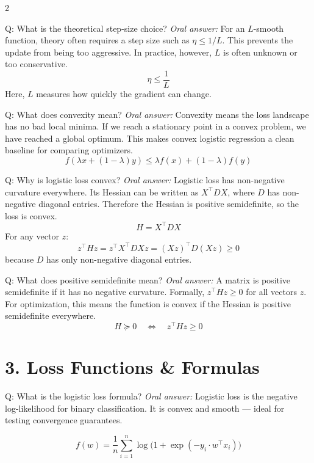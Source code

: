 \documentclass[a4paper,9pt]{article}
\newcommand{\oral}{\textit{\color{darkgray}Oral answer: }}
\begin{document}
\begin{multicols}{2}
\begin{qa}{Q: What is the theoretical step-size choice?}
\oral For an \(L\)-smooth function, theory often requires a step size such as \(\eta\leq 1/L\). 
This prevents the update from being too aggressive. 
In practice, however, \(L\) is often unknown or too conservative.
\[
\eta \leq \frac{1}{L}
\]
Here, \(L\) measures how quickly the gradient can change.
\end{qa}

\begin{qa}{Q: What does convexity mean?}
\oral Convexity means the loss landscape has no bad local minima. 
If we reach a stationary point in a convex problem, we have reached a global optimum. 
This makes convex logistic regression a clean baseline for comparing optimizers.
\[
f(\lambda x+(1-\lambda)y)
\leq
\lambda f(x)+(1-\lambda)f(y)
\]
\end{qa}

\begin{qa}{Q: Why is logistic loss convex?}
\oral Logistic loss has non-negative curvature everywhere. 
Its Hessian can be written as \(X^\top D X\), where \(D\) has non-negative diagonal entries. 
Therefore the Hessian is positive semidefinite, so the loss is convex.
\[
H=X^\top D X
\]
For any vector \(z\):
\[
z^\top H z = z^\top X^\top D Xz = (Xz)^\top D(Xz) \geq 0
\]
because \(D\) has only non-negative diagonal entries.
\end{qa}

\begin{qa}{Q: What does positive semidefinite mean?}
\oral A matrix is positive semidefinite if it has no negative curvature. 
Formally, \(z^\top H z\geq 0\) for all vectors \(z\). 
For optimization, this means the function is convex if the Hessian is positive semidefinite everywhere.
\[
H\succeq 0
\quad \Longleftrightarrow \quad
z^\top H z\geq 0
\]
\end{qa}

\section{3. Loss Functions \& Formulas}

\begin{qa}{Q: What is the logistic loss formula?}
\oral Logistic loss is the negative log-likelihood for binary classification.
It is convex and smooth --- ideal for testing convergence guarantees.

\[
f(w) = \frac{1}{n}\sum_{i=1}^n \log\bigl(1 + \exp(-y_i \cdot w^\top x_i)\bigr)
\]


\end{qa}
\end{multicols}
\end{document}
